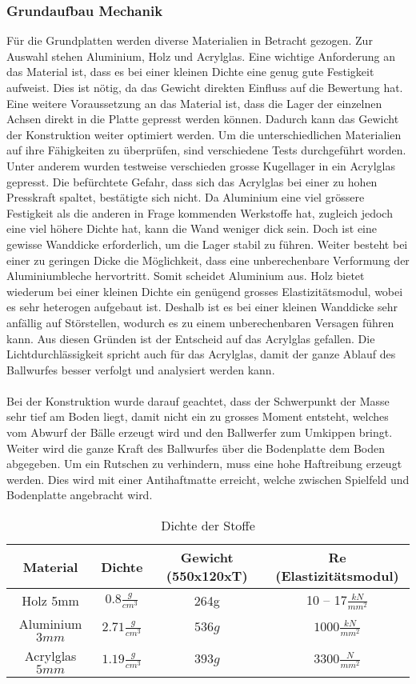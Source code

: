 \subsubsection{Grundaufbau Mechanik}
Für die Grundplatten werden diverse Materialien in Betracht gezogen. Zur Auswahl stehen Aluminium,
Holz und Acrylglas. Eine wichtige Anforderung an das Material ist, dass es bei einer kleinen Dichte
eine genug gute Festigkeit aufweist. Dies ist nötig, da das Gewicht direkten Einfluss auf die
Bewertung hat. Eine weitere Voraussetzung an das Material ist, dass die Lager der einzelnen Achsen
direkt in die Platte gepresst werden können. Dadurch kann das Gewicht der Konstruktion weiter
optimiert werden. Um die unterschiedlichen Materialien auf ihre Fähigkeiten zu überprüfen, sind
verschiedene Tests durchgeführt worden. Unter anderem wurden testweise verschieden grosse Kugellager
in ein Acrylglas gepresst. Die befürchtete Gefahr, dass sich das Acrylglas bei einer zu hohen
Presskraft spaltet, bestätigte sich nicht. Da Aluminium eine viel grössere Festigkeit als die
anderen in Frage kommenden Werkstoffe hat, zugleich jedoch eine viel höhere Dichte hat, kann die
Wand weniger dick sein. Doch ist eine gewisse Wanddicke erforderlich, um die Lager stabil zu führen.
Weiter besteht bei einer zu geringen Dicke die Möglichkeit, dass eine unberechenbare Verformung der
Aluminiumbleche hervortritt. Somit scheidet Aluminium aus. Holz bietet wiederum bei einer kleinen
Dichte ein genügend grosses Elastizitätsmodul, wobei es sehr heterogen aufgebaut ist. Deshalb ist es
bei einer kleinen Wanddicke sehr anfällig auf Störstellen, wodurch es zu einem unberechenbaren
Versagen führen kann. Aus diesen Gründen ist der Entscheid auf das Acrylglas gefallen. Die
Lichtdurchlässigkeit spricht auch für das Acrylglas, damit der ganze Ablauf des Ballwurfes besser
verfolgt und analysiert werden kann.\\
\\
Bei der Konstruktion wurde darauf geachtet, dass der Schwerpunkt der Masse sehr tief am Boden liegt,
damit nicht ein zu grosses Moment entsteht, welches vom Abwurf der Bälle erzeugt wird und den
Ballwerfer zum Umkippen bringt. Weiter wird die ganze Kraft des Ballwurfes über die Bodenplatte dem
Boden abgegeben. Um ein Rutschen zu verhindern, muss eine hohe Haftreibung erzeugt werden. Dies wird
mit einer Antihaftmatte erreicht, welche zwischen Spielfeld und Bodenplatte angebracht wird.
\begin{table}[h!]
	\begin{tabular}{cccc}
		Material & Dichte & Gewicht (550x120xT) & Re (Elastizitätsmodul) \\ 
		\hline Holz 5mm & $0.8 \frac{g}{cm^3}$ & 264g & 10 – 17$\frac{kN}{mm^2}$ \\ 
		Aluminium $3 mm$ & $2.71 \frac{g}{cm^3}$ & $536 g$ & $1000 \frac{kN}{mm^2}$ \\ 
		Acrylglas $5 mm$ & $1.19 \frac{g}{cm^3}$ & $393 g$ & $3300 \frac{N}{mm^2}$  \\ 
	\end{tabular} 
	\caption[Dichte der Stoffe]{Dichte der Stoffe \cite{beruf:Chemie}}
	\centering
\end{table}
